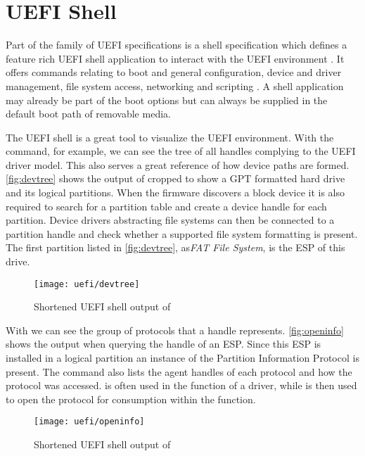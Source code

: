 
\section{\acs{UEFI} Shell}

Part of the family of \ac{UEFI} specifications is a shell specification which defines a feature rich \ac{UEFI} shell application to interact with the \ac{UEFI} environment \cite[Section 1.1]{uefi-shell-spec}.
It offers commands relating to boot and general configuration, device and driver management, file system access, networking \cite[Section 5.1]{uefi-shell-spec} and scripting \cite[Section 4]{uefi-shell-spec}.
A shell application may already be part of the boot options but can always be supplied in the default boot path of removable media.

The \ac{UEFI} shell is a great tool to visualize the \ac{UEFI} environment.
With the  command, for example, we can see the tree of all handles complying to the \ac{UEFI} driver model.
This also serves a great reference of how device paths are formed.
\autoref{fig:devtree} shows the output of  cropped to show a \ac{GPT} formatted hard drive and its logical partitions.
When the firmware discovers a block device it is also required to search for a partition table and create a device handle for each partition.
Device drivers abstracting file systems can then be connected to a partition handle and check whether a supported file system formatting is present.
The first partition listed in \autoref{fig:devtree}, as\emph{FAT File System}, is the \ac{ESP} of this drive.

\begin{figure}[htb]
    \centering
    \texttt{[image: uefi/devtree]}
    \caption{Shortened \ac{UEFI} shell output of }
    \label{fig:devtree}
\end{figure}

With  we can see the group of protocols that a handle represents.
\autoref{fig:openinfo} shows the output when querying the handle of an \ac{ESP}.
Since this \ac{ESP} is installed in a logical partition an instance of the Partition Information Protocol is present.
The command also lists the agent handles of each protocol and how the protocol was accessed.
 is often used in the  function of a driver, while  is then used to open the protocol for consumption within the  function.

\begin{figure}[htb]
    \centering
    \texttt{[image: uefi/openinfo]}
    \caption{Shortened \ac{UEFI} shell output of }
    \label{fig:openinfo}
\end{figure}
